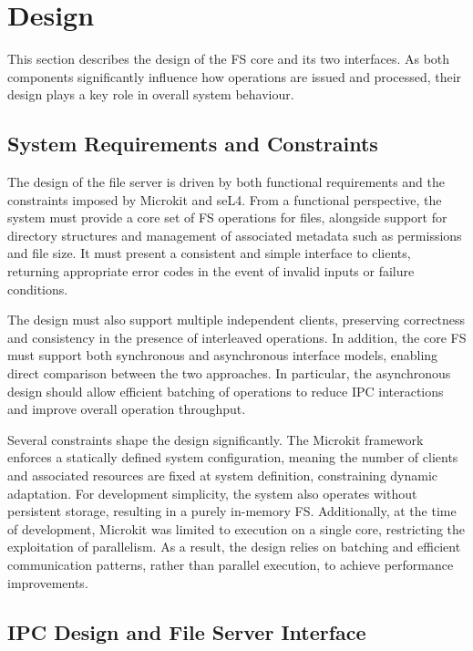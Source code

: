 \chapter{Design}
\label{cha:design}

This section describes the design of the FS core and its two interfaces. As both components significantly influence how operations are issued and processed, their design plays a key role in overall system behaviour. 

\section{System Requirements and Constraints}
The design of the file server is driven by both functional requirements and the constraints imposed by Microkit and seL4. From a functional perspective, the system must provide a core set of FS operations for files, alongside support for directory structures and management of associated metadata such as permissions and file size. It must present a consistent and simple interface to clients, returning appropriate error codes in the event of invalid inputs or failure conditions.

The design must also support multiple independent clients, preserving correctness and consistency in the presence of interleaved operations. In addition, the core FS must support both synchronous and asynchronous interface models, enabling direct comparison between the two approaches. In particular, the asynchronous design should allow efficient batching of operations to reduce IPC interactions and improve overall operation throughput.

Several constraints shape the design significantly. The Microkit framework enforces a statically defined system configuration, meaning the number of clients and associated resources are fixed at system definition, constraining dynamic adaptation. For development simplicity, the system also operates without persistent storage, resulting in a purely in-memory FS. Additionally, at the time of development, Microkit was limited to execution on a single core, restricting the exploitation of parallelism. As a result, the design relies on batching and efficient communication patterns, rather than parallel execution, to achieve performance improvements.

\section{IPC Design and File Server Interface}

